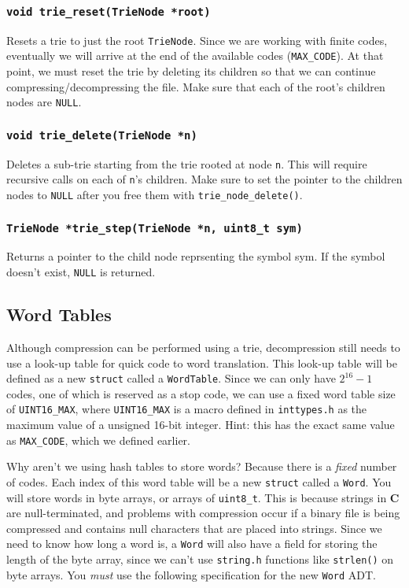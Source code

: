 \documentclass{article}
\begin{document}
\subsubsection{\texttt{void trie\_reset(TrieNode *root)}}
Resets a trie to just the root \texttt{TrieNode}. Since we are working
with finite codes, eventually we will arrive at the end of the available
codes (\texttt{MAX\_CODE}).  At that point, we must reset the trie by
deleting its children so that we can continue compressing/decompressing
the file. Make sure that each of the root's children nodes are
\texttt{NULL}.

\subsubsection{\texttt{void trie\_delete(TrieNode *n)}}
Deletes a sub-trie starting from the trie rooted at node \texttt{n}.
This will require recursive calls on each of \texttt{n}'s children.
Make sure to set the pointer to the children nodes to \texttt{NULL}
after you free them with \texttt{trie\_node\_delete()}.

\subsubsection{\texttt{TrieNode *trie\_step(TrieNode *n, uint8\_t sym)}}
Returns a pointer to the child node reprsenting the symbol sym.
If the symbol doesn't exist, \texttt{NULL} is returned.

\subsection{Word Tables}

Although compression can be performed using a trie, decompression still
needs to use a look-up table for quick code to word translation. This
look-up table will be defined as a new \texttt{struct} called a
\texttt{WordTable}. Since we can only have $2^{16}-1$ codes, one of
which is reserved as a stop code, we can use a fixed word table size of
\texttt{UINT16\_MAX}, where \texttt{UINT16\_MAX} is a macro defined in
\texttt{inttypes.h} as the maximum value of a unsigned 16-bit integer.
Hint: this has the exact same value as \texttt{MAX\_CODE}, which we
defined earlier.

Why aren't we using hash tables to store words? Because there is a
\emph{fixed} number of codes. Each index of this word table will be a
new \texttt{struct} called a \texttt{Word}. You will store words in byte
arrays, or arrays of \texttt{uint8\_t}. This is because strings in
\textbf{C} are null-terminated, and problems with compression occur if a
binary file is being compressed and contains null characters that are
placed into strings.  Since we need to know how long a word is, a
\texttt{Word} will also have a field for storing the length of the byte
array, since we can't use \texttt{string.h} functions like
\texttt{strlen()} on byte arrays. You \emph {must} use the following
specification for the new \texttt{Word} ADT.
\end{document}
